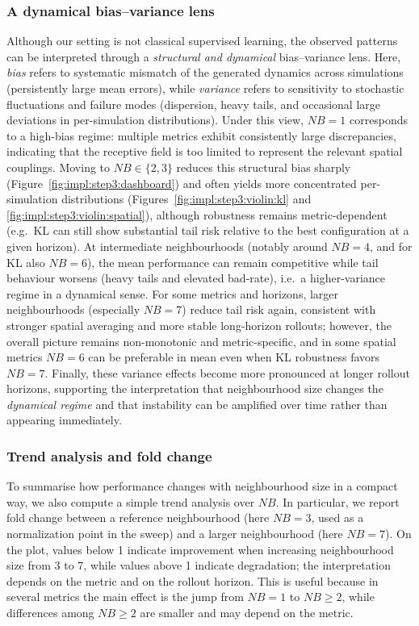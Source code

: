 \subsubsection{A dynamical bias--variance lens}
\label{sec:results:step3:biasvariance}
Although our setting is not classical supervised learning, the observed patterns can be interpreted through a \emph{structural and dynamical} bias--variance lens.
Here, \emph{bias} refers to systematic mismatch of the generated dynamics across simulations (persistently large mean errors), while \emph{variance} refers to sensitivity to stochastic fluctuations and failure modes (dispersion, heavy tails, and occasional large deviations in per-simulation distributions).
Under this view, \(NB=1\) corresponds to a high-bias regime: multiple metrics exhibit consistently large discrepancies, indicating that the receptive field is too limited to represent the relevant spatial couplings.
Moving to \(NB\in\{2,3\}\) reduces this structural bias sharply (Figure~\ref{fig:impl:step3:dashboard}) and often yields more concentrated per-simulation distributions (Figures~\ref{fig:impl:step3:violin:kl} and \ref{fig:impl:step3:violin:spatial}), although robustness remains metric-dependent (e.g.\ KL can still show substantial tail risk relative to the best configuration at a given horizon).
At intermediate neighbourhoods (notably around \(NB=4\), and for KL also \(NB=6\)), the mean performance can remain competitive while tail behaviour worsens (heavy tails and elevated bad-rate), i.e.\ a higher-variance regime in a dynamical sense.
For some metrics and horizons, larger neighbourhoods (especially \(NB=7\)) reduce tail risk again, consistent with stronger spatial averaging and more stable long-horizon rollouts; however, the overall picture remains non-monotonic and metric-specific, and in some spatial metrics \(NB=6\) can be preferable in mean even when KL robustness favors \(NB=7\).
Finally, these variance effects become more pronounced at longer rollout horizons, supporting the interpretation that neighbourhood size changes the \emph{dynamical regime} and that instability can be amplified over time rather than appearing immediately.

\subsubsection{Trend analysis and fold change}
\label{sec:results:step3:trend}

To summarise how performance changes with neighbourhood size in a compact way, we also compute a simple trend analysis over \(NB\).
In particular, we report fold change between a reference neighbourhood (here \(NB=3\), used as a normalization point in the sweep) and a larger neighbourhood (here \(NB=7\)).
On the plot, values below 1 indicate improvement when increasing neighbourhood size from 3 to 7, while values above 1 indicate degradation; the interpretation depends on the metric and on the rollout horizon.
This is useful because in several metrics the main effect is the jump from \(NB=1\) to \(NB\ge2\), while differences among \(NB\ge2\) are smaller and may depend on the metric.

